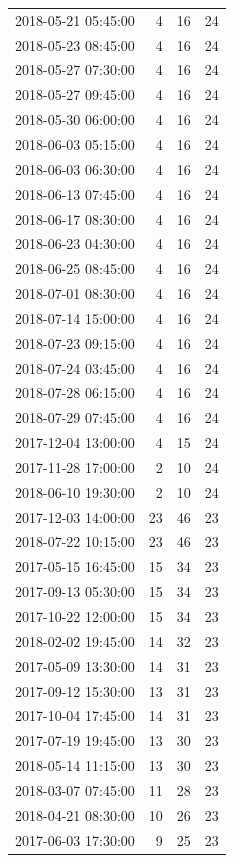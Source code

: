 \begin{tabular}{lrrr}
2018-05-21 05:45:00 & 4 & 16 & 24 \\
2018-05-23 08:45:00 & 4 & 16 & 24 \\
2018-05-27 07:30:00 & 4 & 16 & 24 \\
2018-05-27 09:45:00 & 4 & 16 & 24 \\
2018-05-30 06:00:00 & 4 & 16 & 24 \\
2018-06-03 05:15:00 & 4 & 16 & 24 \\
2018-06-03 06:30:00 & 4 & 16 & 24 \\
2018-06-13 07:45:00 & 4 & 16 & 24 \\
2018-06-17 08:30:00 & 4 & 16 & 24 \\
2018-06-23 04:30:00 & 4 & 16 & 24 \\
2018-06-25 08:45:00 & 4 & 16 & 24 \\
2018-07-01 08:30:00 & 4 & 16 & 24 \\
2018-07-14 15:00:00 & 4 & 16 & 24 \\
2018-07-23 09:15:00 & 4 & 16 & 24 \\
2018-07-24 03:45:00 & 4 & 16 & 24 \\
2018-07-28 06:15:00 & 4 & 16 & 24 \\
2018-07-29 07:45:00 & 4 & 16 & 24 \\
2017-12-04 13:00:00 & 4 & 15 & 24 \\
2017-11-28 17:00:00 & 2 & 10 & 24 \\
2018-06-10 19:30:00 & 2 & 10 & 24 \\
2017-12-03 14:00:00 & 23 & 46 & 23 \\
2018-07-22 10:15:00 & 23 & 46 & 23 \\
2017-05-15 16:45:00 & 15 & 34 & 23 \\
2017-09-13 05:30:00 & 15 & 34 & 23 \\
2017-10-22 12:00:00 & 15 & 34 & 23 \\
2018-02-02 19:45:00 & 14 & 32 & 23 \\
2017-05-09 13:30:00 & 14 & 31 & 23 \\
2017-09-12 15:30:00 & 13 & 31 & 23 \\
2017-10-04 17:45:00 & 14 & 31 & 23 \\
2017-07-19 19:45:00 & 13 & 30 & 23 \\
2018-05-14 11:15:00 & 13 & 30 & 23 \\
2018-03-07 07:45:00 & 11 & 28 & 23 \\
2018-04-21 08:30:00 & 10 & 26 & 23 \\
2017-06-03 17:30:00 & 9 & 25 & 23 \\

\end{tabular}
